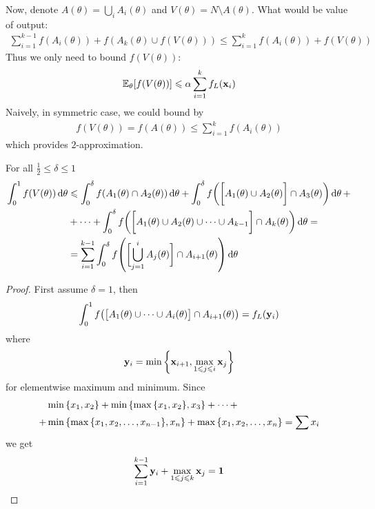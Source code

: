Now, denote $A(\theta) = \bigcup_i A_i(\theta)$ and $V(\theta) = N \setminus A(\theta)$. What would be value of output:
\begin{align}
\sum_{i=1}^{k-1} f(A_i(\theta)) + f(A_k(\theta) \cup f(V(\theta))) \leqslant \sum_{i=1}^k f(A_i(\theta)) + f(V(\theta))
\end{align}
Thus we only need to bound $f(V(\theta))$:
\begin{align}
\mathbb{E}_\theta [f(V(\theta))] \leqslant \alpha \sum_{i=1}^{k} f_L(\vb{x}_i) 
\end{align}
Naively, in symmetric case, we could bound by
\begin{align}
f(V(\theta)) = f(A(\theta)) \leqslant \sum_{i=1}^{k} f(A_i(\theta))  
\end{align}
which provides $2$-approximation.
\begin{lemma}\label{th:delta_lemma}
	For all $\frac{1}{2} \leqslant \delta \leqslant 1$
	\begin{align}
	\int_0^1 f(V(\theta)) \dd{\theta} &\leqslant \int_0^\delta f(A_1(\theta) \cap A_2(\theta)) \dd{\theta} + \int_0^\delta f\qty(\qty\bigg[A_1(\theta) \cup A_2(\theta)] \cap A_3(\theta)) \dd{\theta} +\\&+ \dots + \int_0^\delta f\qty(\qty\bigg[A_1(\theta) \cup A_2(\theta) \cup \dots \cup A_{k-1}] \cap A_k(\theta)) \dd{\theta} =\\&= \sum_{i=1}^{k-1} \int_0^\delta f\qty(\qty\bigg[ \bigcup_{j=1}^{i} A_j(\theta)] \cap A_{i+1}(\theta)) \dd{\theta} 
	\end{align}
	\begin{proof}
		First assume $\delta=1$, then
		\begin{align}
		\int_0^1 f\qty(\qty\big[A_1(\theta) \cup \dots \cup A_{i}(\theta)] \cap A_{i+1}(\theta)) = f_L(\vb{y}_i)
		\end{align}
		where
		\begin{align}
		\vb{y}_i = \min \qty{\vb{x}_{i+1},\max\limits_{1\leqslant j \leqslant i} \vb{x}_j  }
		\end{align}
		for elementwise maximum and minimum. Since
		\begin{align}
		&\min\qty{x_1, x_2} + \min\qty{\max\qty{x_1, x_2} , x_3} +\dots +\\+& \min\qty{\max\qty{x_1, x_2, \dots, x_{n-1}} , x_n} +\max\qty{x_1, x_2, \dots, x_{n}} = \sum x_i
		\end{align}
		we get
		\begin{align}
		\sum_{i=1}^{k-1} \vb{y}_i + \max\limits_{1\leqslant j \leqslant k} \vb{x}_j  = \vb{1}
		\end{align}
		

\end{proof}
\end{lemma}

